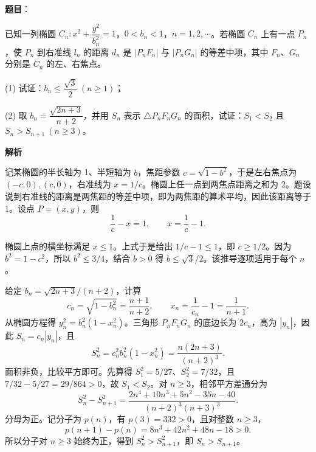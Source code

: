 \begin{answer}

\textbf{题目}：

已知一列椭圆 \(C_n:x^2+\dfrac{y^2}{b_n^2}=1\)，\(0<b_n<1\)，\(n=1,2,\cdots\)。若椭圆 \(C_n\) 上有一点 \(P_n\)，使 \(P_n\) 到右准线 \(l_n\) 的距离 \(d_n\) 是 \(|P_nF_n|\) 与 \(|P_nG_n|\) 的等差中项，其中 $F_n\text{、}G_n$ 分别是 \(C_n\) 的左、右焦点。
\nopagebreak[4]
\begin{center}\end{center}
\nopagebreak[4]
(1) 试证：\(b_n\leq\dfrac{\sqrt3}{2}\ (n\geq1)\)；

(2) 取 \(b_n=\dfrac{\sqrt{2n+3}}{n+2}\)，并用 \(S_n\) 表示 \(\triangle P_nF_nG_n\) 的面积，试证：\(S_1<S_2\) 且 \(S_n>S_{n+1}\ (n\geq3)\)。

\textbf{解析}

记某椭圆的半长轴为 1、半短轴为 \(b\)，焦距参数 \(c=\sqrt{1-b^2}\)，于是左右焦点为 \((-c,0),(c,0)\)，右准线为 \(x=1/c\)。椭圆上任一点到两焦点距离之和为 2。题设说到右准线的距离是两焦距的等差中项，即为两焦距的算术平均，因此该距离等于 1。设点 \(P=(x,y)\)，则
\nopagebreak[4]
\[
\frac1c-x=1,\qquad x=\frac1c-1.
\]


椭圆上点的横坐标满足 \(x\le1\)。上式于是给出 \(1/c-1\le1\)，即 \(c\ge1/2\)。因为 \(b^2=1-c^2\)，所以 \(b^2\le3/4\)，结合 \(b>0\) 得 \(b\le\sqrt3/2\)。该推导逐项适用于每个 \(n\)。


给定 \(b_n=\sqrt{2n+3}/(n+2)\)，计算
\nopagebreak[4]
\[
c_n=\sqrt{1-b_n^2}=\frac{n+1}{n+2},\qquad x_n=\frac1{c_n}-1=\frac1{n+1}.
\]
从椭圆方程得 \(y_n^2=b_n^2(1-x_n^2)\)。三角形 \(P_nF_nG_n\) 的底边长为 \(2c_n\)，高为 \(|y_n|\)，因此 \(S_n=c_n|y_n|\)，且
\nopagebreak[4]
\[
S_n^2=c_n^2b_n^2(1-x_n^2)
=\frac{n(2n+3)}{(n+2)^3}.
\]
面积非负，比较平方即可。先算得 \(S_1^2=5/27\)、\(S_2^2=7/32\)，且 \(7/32-5/27=29/864>0\)，故 \(S_1<S_2\)。对 \(n\ge3\)，相邻平方差通分为
\nopagebreak[4]
\[
S_n^2-S_{n+1}^2
=\frac{2n^4+10n^3+5n^2-35n-40}{(n+2)^3(n+3)^3}.
\]
分母为正。记分子为 \(p(n)\)，有 \(p(3)=332>0\)，且对整数 \(n\ge3\)，
\nopagebreak[4]
\[
p(n+1)-p(n)=8n^3+42n^2+48n-18>0.
\]
所以分子对 \(n\ge3\) 始终为正，得到 \(S_n^2>S_{n+1}^2\)，即 \(S_n>S_{n+1}\)。



\end{answer}